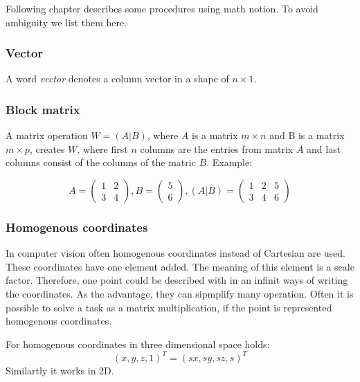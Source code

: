 Following chapter describes some procedures using math notion. To avoid
ambiguity we list them here.

\subsubsection*{Vector}
A word \emph{vector} denotes a column vector in a shape of $n\times1$.

\subsubsection*{Block matrix}
A matrix operation $W = (A|B)$, where $A$ is a matrix $m \times n$ and B is a
matrix $m \times p$, creates $W$, where first $n$ columns are the entries from
matrix $A$ and last columns consist of the columns of the matric $B$.
Example:

\[
A = \begin{pmatrix}
        1 & 2 \\
        3 & 4
\end{pmatrix},
B = \begin{pmatrix}
5 \\
6
\end{pmatrix},
(A|B) = \begin{pmatrix}
        1 & 2 & 5 \\
        3 & 4 & 6
\end{pmatrix}
\]

\subsubsection*{Homogenous coordinates}

In computer vision often homogenous coordinates instead of Cartesian are used.
These coordinates have one element added. The meaning of this element is a
scale factor.  Therefore, one point could be described with in an infinit ways
of writing the coordinates. As the advantage, they can sipmplify many
operation. Often it is possible to solve a task as a matrix multiplication, if
the point is represented homogenous coordinates.

For homogenous coordinates in three dimensional space holds:
$$ (x, y, z, 1)^T = (sx, sy, sz, s)^T $$
Similartly it works in 2D.
